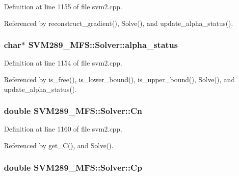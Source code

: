 Definition at line 1155 of file svm2.\+cpp.



Referenced by reconstruct\+\_\+gradient(), Solve(), and update\+\_\+alpha\+\_\+status().

\subsubsection[{\texorpdfstring{alpha\+\_\+status}{alpha_status}}]{\setlength{\rightskip}{0pt plus 5cm}char$\ast$ S\+V\+M289\+\_\+\+M\+F\+S\+::\+Solver\+::alpha\+\_\+status\hspace{0.3cm}{\ttfamily [protected]}}\hypertarget{class_s_v_m289___m_f_s_1_1_solver_a1f3505d06f19ce96eff19d3908adc42d}{}\label{class_s_v_m289___m_f_s_1_1_solver_a1f3505d06f19ce96eff19d3908adc42d}


Definition at line 1154 of file svm2.\+cpp.



Referenced by is\+\_\+free(), is\+\_\+lower\+\_\+bound(), is\+\_\+upper\+\_\+bound(), Solve(), and update\+\_\+alpha\+\_\+status().

\subsubsection[{\texorpdfstring{Cn}{Cn}}]{\setlength{\rightskip}{0pt plus 5cm}double S\+V\+M289\+\_\+\+M\+F\+S\+::\+Solver\+::\+Cn\hspace{0.3cm}{\ttfamily [protected]}}\hypertarget{class_s_v_m289___m_f_s_1_1_solver_a56f6a320000a868937411fa4cfd458b5}{}\label{class_s_v_m289___m_f_s_1_1_solver_a56f6a320000a868937411fa4cfd458b5}


Definition at line 1160 of file svm2.\+cpp.



Referenced by get\+\_\+\+C(), and Solve().

\subsubsection[{\texorpdfstring{Cp}{Cp}}]{\setlength{\rightskip}{0pt plus 5cm}double S\+V\+M289\+\_\+\+M\+F\+S\+::\+Solver\+::\+Cp\hspace{0.3cm}{\ttfamily [protected]}}\hypertarget{class_s_v_m289___m_f_s_1_1_solver_a951f59ea72f372f0e188c5815774fc6d}{}\label{class_s_v_m289___m_f_s_1_1_solver_a951f59ea72f372f0e188c5815774fc6d}


